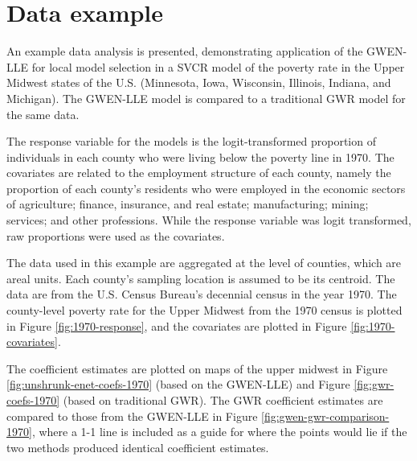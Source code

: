 \documentclass[authoryear, review, 11pt]{elsarticle}
\begin{document}
	
	
	
				
	

			
\section{Data example\label{section:data-analysis}}
    An example data analysis is presented, demonstrating application of the GWEN-LLE for local model selection in a SVCR model of the poverty rate in the Upper Midwest states of the U.S. (Minnesota, Iowa, Wisconsin, Illinois, Indiana, and Michigan). The GWEN-LLE model is compared to a traditional GWR model for the same data.

    The response variable for the models is the logit-transformed proportion of individuals in each county who were living below the poverty line in 1970. The covariates are related to the employment structure of each county, namely the proportion of each county's residents who were employed in the economic sectors of agriculture; finance, insurance, and real estate; manufacturing; mining; services; and other professions. While the response variable was logit transformed, raw proportions were used as the covariates.

The data used in this example are aggregated at the level of counties, which are areal units. Each county's sampling location is assumed to be its centroid. The data are from the U.S. Census Bureau's decennial census in the year 1970. The county-level poverty rate for the Upper Midwest from the 1970 census is plotted in Figure \ref{fig:1970-response}, and the covariates are plotted in Figure \ref{fig:1970-covariates}.
	
The coefficient estimates are plotted on maps of the upper midwest in Figure \ref{fig:unshrunk-enet-coefs-1970} (based on the GWEN-LLE) and Figure \ref{fig:gwr-coefs-1970} (based on traditional GWR). The GWR coefficient estimates are compared to those from the GWEN-LLE in Figure \ref{fig:gwen-gwr-comparison-1970}, where a 1-1 line is included as a guide for where the points would lie if the two methods produced identical coefficient estimates.
\end{document}

